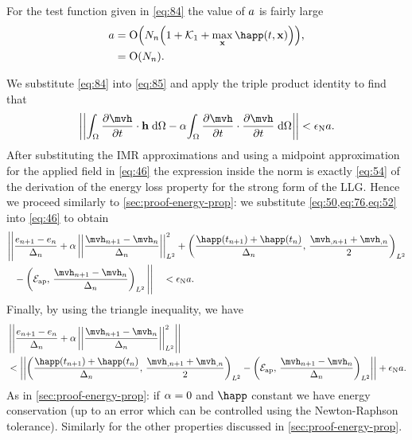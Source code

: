 For the test function given in \cref{eq:84} the value of $a$ is fairly large
\begin{equation}
  \begin{aligned}
    a &= \order{N_n \bigb{1 + \kone + \max_{\xv} \happ(t, \xv)} }, \\
    &= \order{N_n}.
  \end{aligned}
\end{equation}


We substitute \cref{eq:84} into \cref{eq:85} and apply the triple product identity to find that
\begin{equation}
  \norm{\intd{\dmdth \cdot \hv} - \dampc \intd{\dmdth \cdot \dmdth}} < \ntol \sumbasiscoeff.
  \label{eq:46}
\end{equation}
After substituting the IMR approximations and using a midpoint approximation for the applied field in \cref{eq:46} the expression inside the norm is exactly \cref{eq:54} of the derivation of the energy loss property for the strong form of the LLG.
Hence we proceed similarly to \cref{sec:proof-energy-prop}: we substitute  \cref{eq:50,eq:76,eq:52} into \cref{eq:46} to obtain
\begin{equation}
  \begin{aligned}
    \Bigg|\Bigg| &\frac{\e_{n+1} - \e_n}{\dtn} + \dampc \ltnorm{\frac{\mvh_{n+1} - \mvh_n}{\dtn}}^2 +
      \ltip{\frac{\happ(t_{n+1}) +\happ(t_n)}{\dtn}}{\frac{\mvh_{,n+1} +
          \mvh_{,n}}{2}} \\
      &- \ltip{\happerror}{\frac{\mvh_{n+1} - \mvh_n}{\dtn}} \Bigg|\Bigg| \quad < \ntol \sumbasiscoeff.
  \end{aligned}
\end{equation}
Finally, by using the triangle inequality, we have
\begin{equation}
  \begin{aligned}
    &\norm{ \frac{\e_{n+1} - \e_n}{\dtn} + \dampc \ltnorm{\frac{\mvh_{n+1} - \mvh_n}{\dtn}}^2 } \\
    &< \norm{\ltip{\frac{\happ(t_{n+1}) + \happ(t_n)}{\dtn}}{\frac{\mvh_{,n+1} + \mvh_{,n}}{2}} - \ltip{\happerror}{\frac{\mvh_{n+1} - \mvh_n}{\dtn}} }
  + \ntol \sumbasiscoeff.
  \label{eq:86}
  \end{aligned}
\end{equation}
As in \cref{sec:proof-energy-prop}: if $\alpha = 0$ and $\happ$ constant we have energy conservation (up to an error which can be controlled using the Newton-Raphson tolerance). Similarly for the other properties discussed in \cref{sec:proof-energy-prop}.


